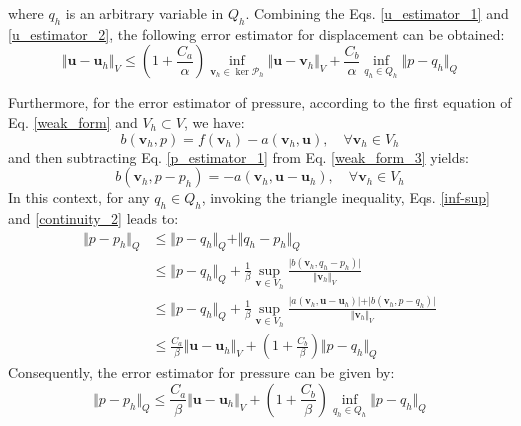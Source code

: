 where $q_h$ is an arbitrary variable in $Q_h$.
Combining the Eqs. \eqref{u_estimator_1} and \eqref{u_estimator_2}, the following error estimator for displacement can be obtained:
\begin{equation}\label{u_estimator}
\Vert \boldsymbol u - \boldsymbol u_h \Vert_V \le (1+\frac{C_a}{\alpha}) \inf_{\boldsymbol v_h \in \ker \mathcal P_h} \Vert \boldsymbol u - \boldsymbol v_h \Vert_V + \frac{C_b}{\alpha} \inf_{q_h \in Q_h} \Vert p - q_h \Vert_Q
\end{equation}

Furthermore, for the error estimator of pressure, according to the first equation of Eq. \eqref{weak_form} and $V_h \subset V$, we have:
\begin{equation}\label{p_estimator_1}
b(\boldsymbol v_h, p) = f(\boldsymbol v_h) - a(\boldsymbol v_h, \boldsymbol u), \quad \forall \boldsymbol v_h \in V_h
\end{equation}
and then subtracting Eq. \eqref{p_estimator_1} from Eq. \eqref{weak_form_3} yields:
\begin{equation}\label{p_estimator_2}
b(\boldsymbol v_h, p - p_h) = -a(\boldsymbol v_h, \boldsymbol u - \boldsymbol u_h), \quad \forall \boldsymbol v_h \in V_h
\end{equation}
In this context, for any $q_h \in Q_h$, invoking the triangle inequality, Eqs. \eqref{inf-sup} and \eqref{continuity_2} leads to:
\begin{equation}\label{p_estimator_3}
\begin{split}
\Vert p-p_{h}\Vert_{Q} &\le \Vert p - q_{h} \Vert_{Q} + \Vert q_{h}-p_{h}\Vert_{Q} \\
&\le \Vert p-q_{h}\Vert_{Q} + \frac{1}{\beta}\sup_{\boldsymbol v\in V_{h}} \frac{\vert b(\boldsymbol v_{h},q_{h}-p_{h})\vert}{\Vert \boldsymbol v_{h}\Vert_{V}} \\
&\le \Vert p-q_{h}\Vert_{Q} + \frac{1}{\beta}\sup_{\boldsymbol v\in V_{h}} \frac{\vert a(\boldsymbol v_{h},\boldsymbol u-\boldsymbol u_{h})\vert + \vert b(\boldsymbol v_{h},p-q_{h})\vert}{\Vert \boldsymbol v_{h}\Vert_{V}} \\
&\le \frac{C_a}{\beta} \Vert \boldsymbol u-\boldsymbol u_{h} \Vert_{V} + (1+\frac{C_b}{\beta}) \Vert p - q_{h} \Vert_{Q}
\end{split}
\end{equation}
Consequently, the error estimator for pressure can be given by:
\begin{equation}\label{p_estimator}
\Vert p-p_{h}\Vert_{Q} \le 
\frac{C_a}{\beta} \Vert \boldsymbol u - \boldsymbol u_h \Vert_V + (1+\frac{C_b}{\beta}) \inf_{q_h \in Q_h} \Vert p - q_h \Vert_Q
\end{equation}


